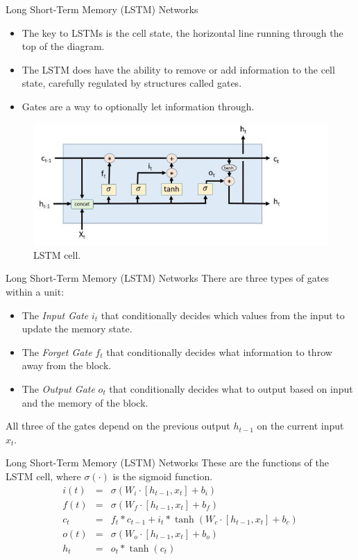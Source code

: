 \documentclass{beamer}
\begin{document}
\begin{frame}{Long Short-Term Memory (LSTM) Networks}
	\begin{itemize}
		\item The key to LSTMs is the cell state, the horizontal line running through the top of the diagram. 
		\item The LSTM does have the ability to remove or add information to the cell state, carefully regulated by structures called gates.
		\item Gates are a way to optionally let information through.
	\end{itemize}
	\begin{figure}[htbp]
		\includegraphics[scale=0.35]{images/lstm_cell.jpg}
		\caption*{LSTM cell.}
	\end{figure}
\end{frame}
\begin{frame}{Long Short-Term Memory (LSTM) Networks}
	There are three types of gates within a unit:
	\begin{itemize}
		\item The \textit{Input Gate} $i_t$ that conditionally decides which values from the input to update the memory state.
		\item The \textit{Forget Gate} $f_t$ that conditionally decides what information to throw away from the block.
		\item The \textit{Output Gate} $o_t$ that conditionally decides what to output based on input and the memory of the block.
	\end{itemize}
	All three of the gates depend on the previous output $h_{t-1}$ on the current input $x_t$.
\end{frame}
\begin{frame}{Long Short-Term Memory (LSTM) Networks}
	These are the functions of the LSTM cell, where $\sigma(\cdot)$ is the sigmoid function.
	\begin{eqnarray*}
		i(t) &=& \sigma(W_i \cdot [h_{t-1}, x_t] + b_i)\\
		f(t) &=& \sigma(W_f \cdot [h_{t-1}, x_t] + b_f)\\
		c_t &=& f_t \ast c_{t-1} + i_t \ast \tanh(W_c \cdot [h_{t-1}, x_t] + b_c)\\
		o(t) &=& \sigma(W_o \cdot [h_{t-1}, x_t] + b_o)\\
		h_t &=& o_t \ast \tanh(c_t)
	\end{eqnarray*}
\end{frame}
\end{document}
